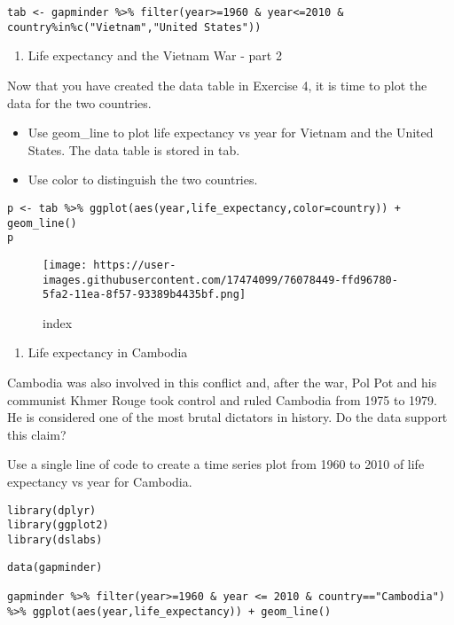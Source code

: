 \documentclass[]{article}
\providecommand{\tightlist}{%
  \setlength{\itemsep}{0pt}\setlength{\parskip}{0pt}}
\begin{document}
\begin{verbatim}
tab <- gapminder %>% filter(year>=1960 & year<=2010 & country%in%c("Vietnam","United States"))
\end{verbatim}

\begin{enumerate}
\def\labelenumi{\arabic{enumi}.}
\setcounter{enumi}{4}
\tightlist
\item
  Life expectancy and the Vietnam War - part 2
\end{enumerate}

Now that you have created the data table in Exercise 4, it is time to
plot the data for the two countries.

\begin{itemize}
\tightlist
\item
  Use geom\_line to plot life expectancy vs year for Vietnam and the
  United States. The data table is stored in tab.
\item
  Use color to distinguish the two countries.
\end{itemize}

\begin{verbatim}
p <- tab %>% ggplot(aes(year,life_expectancy,color=country)) + geom_line()
p
\end{verbatim}

\begin{figure}
\centering
\texttt{[image: https://user-images.githubusercontent.com/17474099/76078449-ffd96780-5fa2-11ea-8f57-93389b4435bf.png]}
\caption{index}
\end{figure}

\begin{enumerate}
\def\labelenumi{\arabic{enumi}.}
\setcounter{enumi}{5}
\tightlist
\item
  Life expectancy in Cambodia
\end{enumerate}

Cambodia was also involved in this conflict and, after the war, Pol Pot
and his communist Khmer Rouge took control and ruled Cambodia from 1975
to 1979. He is considered one of the most brutal dictators in history.
Do the data support this claim?

Use a single line of code to create a time series plot from 1960 to 2010
of life expectancy vs year for Cambodia.

\begin{verbatim}
library(dplyr)
library(ggplot2)
library(dslabs)
\end{verbatim}

\begin{verbatim}
data(gapminder)

gapminder %>% filter(year>=1960 & year <= 2010 & country=="Cambodia") %>% ggplot(aes(year,life_expectancy)) + geom_line()
\end{verbatim}
\end{document}
